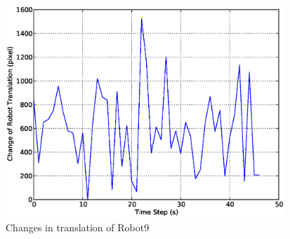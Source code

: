 \documentclass{llncs}
\begin{document}
\begin{figure}
\centering
\includegraphics[height=8cm, angle=0]{images/global/DeltaRobot9-PoseAtTS-2010Feb18-121037.eps}
\caption{\small Changes in translation of Robot9}
\label{fig:single-robot-translation} %
\end{figure}
%
%
\end{document}
